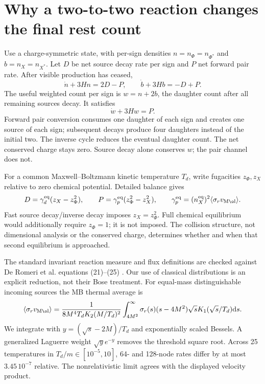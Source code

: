 \documentclass[11pt]{article}
\newcommand{\dd}{\mathrm d}
\newcommand{\eq}{\mathrm{eq}}
\begin{document}
\section{Why a two-to-two reaction changes the final rest count}
Use a charge-symmetric state, with per-sign densities $n=n_\Phi=n_{\Phi^*}$
and $b=n_X=n_{X^*}$. Let $D$ be net source decay rate per sign and $P$
net forward pair rate. After visible production has ceased,
\begin{equation}
 \dot n+3Hn=2D-P,\qquad
 \dot b+3Hb=-D+P.
\end{equation}
The useful weighted count per sign is $w=n+2b$, the daughter count after
all remaining sources decay. It satisfies
\begin{equation}
 \boxed{\dot w+3Hw=P.}
\end{equation}
Forward pair conversion consumes one daughter of each sign and creates
one source of each sign; subsequent decays produce four daughters instead
of the initial two. The inverse cycle reduces the eventual daughter count.
The net conserved charge stays zero. Source decay alone conserves $w$;
the pair channel does not.

For a common Maxwell--Boltzmann kinetic temperature $T_d$, write fugacities
$z_\Phi,z_X$ relative to zero chemical potential. Detailed balance gives
\begin{equation}
 D=\gamma_d^\eq(z_X-z_\Phi^2),\qquad
 P=\gamma_p^\eq(z_\Phi^2-z_X^2),\qquad
 \gamma_p^\eq=(n_X^\eq)^2\langle\sigma_r v_{\rm M\o l}\rangle.
\end{equation}
Fast source decay/inverse decay imposes $z_X=z_\Phi^2$. Full chemical
equilibrium would additionally require $z_\Phi=1$; it is not imposed.
The collision structure, not dimensional analysis or the conserved charge,
determines whether and when that second equilibrium is approached.

The standard invariant reaction measure and flux definitions are checked
against De Romeri et al. equations (21)--(25) \cite{rates}. Our use of
classical distributions is an explicit reduction, not their Bose treatment.
For equal-mass distinguishable incoming sources the MB thermal average is
\begin{equation}
 \langle\sigma_rv_{\rm M\o l}\rangle=
 \frac{1}{8M^4T_d K_2(M/T_d)^2}
 \int_{4M^2}^\infty\sigma_r(s)(s-4M^2)\sqrt{s}
 K_1(\sqrt{s}/T_d)\dd s.
\end{equation}
We integrate with $y=(\sqrt s-2M)/T_d$ and exponentially scaled Bessels.
A generalized Laguerre weight $\sqrt y e^{-y}$ removes the threshold
square root. Across 25 temperatures in $T_d/m\in[10^{-5},10]$, 64- and
128-node rates differ by at most $3.45\,10^{-7}$ relative. The nonrelativistic
limit agrees with the displayed velocity product.
\end{document}
